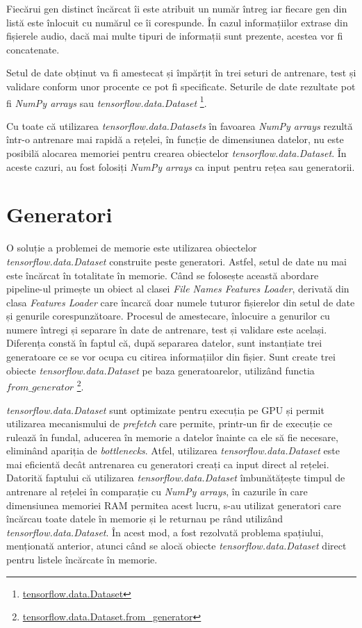 Fiecărui gen distinct încărcat îi este atribuit un număr întreg iar fiecare gen din listă este înlocuit cu numărul ce îi corespunde.
În cazul informațiilor extrase din fișierele audio, dacă mai multe tipuri de informații sunt prezente, acestea vor fi concatenate.

Setul de date obținut va fi amestecat și împărțit în trei seturi de antrenare, test și validare conform unor procente ce pot fi
specificate. Seturile de date rezultate pot fi
\textit{NumPy arrays} sau \textit{tensorflow.data.Dataset} \footnote{\href{https://www.tensorflow.org/api_docs/python/tf/data/Dataset}{tensorflow.data.Dataset}}.

Cu toate că utilizarea \textit{tensorflow.data.Datasets} în favoarea \textit{NumPy arrays} rezultă într-o antrenare mai rapidă a rețelei, în funcție de dimensiunea
datelor, nu este posibilă alocarea memoriei pentru crearea obiectelor \textit{tensorflow.data.Dataset}. În aceste cazuri, au fost folosiți \textit{NumPy arrays}
ca input pentru rețea sau generatorii.

\section{Generatori}
O soluție a problemei de memorie este utilizarea obiectelor \textit{tensorflow.data.Dataset} construite peste generatori. Astfel, setul de date nu
mai este încărcat în totalitate în memorie. Când se folosește această abordare pipeline-ul primește un obiect al clasei \textit{File Names
Features Loader}, derivată din clasa \textit{Features Loader} care încarcă doar numele tuturor fișierelor din setul de date și genurile
corespunzătoare. Procesul de amestecare, înlocuire a genurilor cu numere întregi și separare în date de antrenare, test și validare
este același. Diferența constă în faptul că, după separarea datelor, sunt instanțiate trei generatoare ce se vor ocupa cu citirea
informațiilor din fișier. Sunt create trei obiecte \textit{tensorflow.data.Dataset} pe baza generatoarelor, utilizând functia $from\_generator$
\footnote{\href{https://www.tensorflow.org/api_docs/python/tf/data/Dataset\#from\_generator}{tensorflow.data.Dataset.from\_generator}}.

\textit{tensorflow.data.Dataset} sunt optimizate pentru execuția pe GPU și permit utilizarea mecanismului de \textit{prefetch} care permite,
printr-un fir de execuție ce rulează în fundal,
aducerea în memorie a datelor înainte ca ele să fie necesare, eliminând apariția de \textit{bottlenecks}. Atfel, utilizarea \textit{tensorflow.data.Dataset}
este mai eficientă decât antrenarea cu generatori
creați ca input direct al rețelei. Datorită faptului că utilizarea \textit{tensorflow.data.Dataset} îmbunătățește timpul de antrenare al rețelei în comparație
cu \textit{NumPy arrays}, în cazurile în care dimensiunea memoriei RAM permitea acest lucru, s-au utilizat generatori care încărcau toate datele în
memorie și le returnau pe rând utilizând \textit{tensorflow.data.Dataset}. În acest mod, a fost rezolvată problema spațiului, menționată anterior,
atunci când se alocă
obiecte \textit{tensorflow.data.Dataset} direct pentru listele încărcate în memorie.


